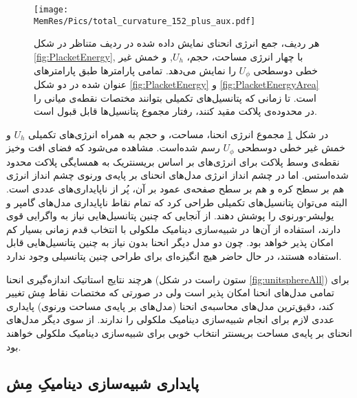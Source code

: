 \begin{figure}[htbp]
\begin{center}
\texttt{[image: \\MemRes/Pics/total\_curvature\_152\_plus\_aux.pdf]}
\caption{
هر ردیف، جمع انرژی انحنای نمایش داده شده در ردیف متناظر در  شکل
\ref{fig:PlacketEnergy},
با چهار انرژی مساحت، حجم، 
$U_h$,
و خمش غیر خطی دوسطحی 
$U_\phi$
را نمایش می‌دهد. تمامی‌ پارامتر‌ها طبق پارامتر‌های عنوان شده در دو شکل 
\ref{fig:PlacketEnergy}
و
\ref{fig:PlacketEnergyArea}
است. تا زمانی که پتانسیل‌های تکمیلی بتوانند مختصات نقطه‌ی میانی را در محدوده‌ی پلاکت مقید کنند، رفتار مجموع پتانسیل‌ها قابل قبول است. 
}
\label{fig:PlacketEnergyAll}
\end{center}
\end{figure}


در شکل 
\ref{fig:PlacketEnergyAll}
مجموع انرژی انحنا، مساحت، و حجم به همراه انرژی‌های تکمیلی 
$U_h$
و خمش غیر خطی دوسطحی 
$U_\phi$
رسم شده‌است. مشاهده می‌شود که فضای افت وخیز نقطه‌ی وسط پلاکت برای انرژی‌های بر اساس بریسنتریک به همسایگی پلاکت محدود شده‌استس. اما در چشم انداز انرژی مدل‌های انحنای بر پایه‌ی ورنوی چشم انداز انرژی هم بر سطح کره و هم بر سطح صفحه‌ی عمود بر آن، پُر از ناپایداری‌های عددی است. البته می‌توان پتانسیل‌های تکمیلی طراحی کرد که تمام نقاط ناپایداری مدل‌های گامپر و یولیشر-ورنوی را پوشش دهند. از آنجایی که چنین پتانسیل‌هایی نیاز به واگرایی قوی دارند، استفاده از آن‌ها در شبیه‌سازی دینامیک ملکولی با انتخاب قدم زمانی بسیار کم امکان پذیر خواهد بود. چون دو مدل دیگر انحنا بدون نیاز به چنین پتانسیل‌هایی قابل استفاده هستند، در حال حاضر هیچ انگیزه‌ای برای طراحی چنین پتانسیلی وجود ندارد.

هرچند نتایج استاتیک اندازه‌گیری انحنا (ستون راست در شکل
\ref{fig:unitsphereAll})
 برای تمامی‌ مدل‌های انحنا امکان پذیر است ولی در صورتی که مختصات نقاط مِش تغییر کند، دقیق‌ترین مدل‌های محاسبه‌ی انحنا (مدل‌های بر پایه‌ی مساحت ورنوی) پایداری عددی لازم برای انجام شبیه‌سازی دینامیک ملکولی را ندارند. از سوی دیگر مدل‌های انحنای بر پایه‌ی مساحت بریسنتر انتخاب خوبی برای شبیه‌سازی دینامیک ملکولی خواهند بود.









\subsection{\label{sec:ResultsStability}
پایداری شبیه‌سازی دینامیکِ مِش
}

